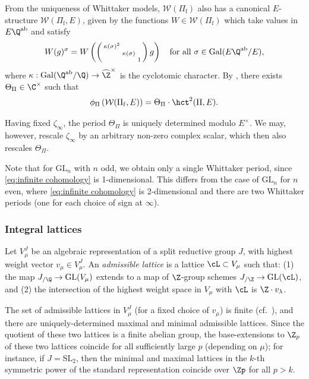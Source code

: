 \documentclass[10pt,reqno,a4paper]{amsart}
\newcommand{\sdthree}[3]{\left(\begin{smallmatrix}#1 \\ & #2\\ && #3\end{smallmatrix}\right)}
\newcommand{\Pif}{\Pi\subf}
\newcommand{\subf}{_{\mathrm{f}}}
\newcommand{\SL}{\mathrm{SL}}
\newcommand{\GL}{\mathrm{GL}}
\begin{document}
From the uniqueness of Whittaker models, $\mathcal{W}(\Pif)$ also has a canonical $E$-structure $\mathcal{W}(\Pif, E)$, given by the functions $W \in \mathcal{W}(\Pif)$ which take values in $E\Q^{\mathrm{ab}}$ and satisfy
\[ W(g)^{\sigma} = W\left(\sdthree{\kappa(\sigma)^2}{\kappa(\sigma)}{1} g\right) \quad\text{for all $\sigma \in \operatorname{Gal}(E \Q^{\mathrm{ab}} / E)$},\]
where $\kappa: \operatorname{Gal}(\Q^{\mathrm{ab}} / \Q) \to \widehat{\Z}^\times$ is the cyclotomic character. By \cite[Prop.\ 3.1]{Clo90}, there exists $\Theta_\Pi \in \C^\times$ such that
\[
\phi_\Pi\left(\mathcal{W}(\Pif, E)\right) = \Theta_\Pi \cdot \hct^2(\Pi, E).
\]


\begin{remark}
Having fixed $\zeta_\infty$, the period $\Theta_\Pi$ is uniquely determined modulo $E^\times$. We may, however, rescale $\zeta_\infty$ by an arbitrary non-zero complex scalar, which then also rescales $\Theta_\Pi$.

Note that for $\GL_n$ with $n$ odd, we obtain only a single Whittaker period, since \eqref{eq:infinite cohomology} is 1-dimensional. This differs from the case of $\GL_n$ for $n$ even, where \eqref{eq:infinite cohomology} is 2-dimensional and there are two Whittaker periods (one for each choice of sign at $\infty$).
\end{remark}

\subsubsection{Integral lattices}

Let $V_\mu^J$ be an algebraic representation of a split reductive group $J$, with highest weight vector $v_\mu \in V_\mu^J$. An \emph{admissible lattice} is a lattice $\cL \subset V_\mu$ such that: (1) the map $J_{/\Q} \to \GL(V_\mu)$ extends to a map of $\Z$-group schemes $J_{/\Z} \to \GL(\cL)$, and (2) the intersection of the highest weight space in $V_\mu$ with $\cL$ is $\Z\cdot v_\lambda$.

The set of admissible lattices in $V_\mu^J$ (for a fixed choice of $v_\mu$) is finite (cf.~\cite[\S 4.2]{LSZ17}), and there are uniquely-determined maximal and minimal admissible lattices. Since the quotient of these two lattices is a finite abelian group, the base-extensions to $\Z_p$ of these two lattices coincide for all sufficiently large $p$ (depending on $\mu$); for instance, if $J = \SL_2$, then the minimal and maximal lattices in the $k$-th symmetric power of the standard representation coincide over $\Zp$ for all $p > k$.
\end{document}
